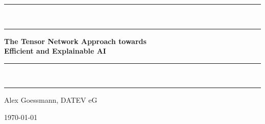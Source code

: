 
\newcommand{\vsp}[1]{\vspace{#1\baselineskip}}
\newcommand{\hsp}[1]{\hspace{#1em}}


{\hfuzz=12pt
\begin{fullsizetitle}
\centering

	\vsp{10}
	
	\vsp{3}
	
	\rule{0.7\textwidth}{.4pt}\\[\dimexpr-\baselineskip+1mm+2pt]
	\rule{0.7\textwidth}{2pt}
	
	\vsp{1}
	\begin{minipage}{.7\textwidth}
		\centering\Large
		\textbf{The Tensor Network Approach towards \\
		Efficient and Explainable AI}
	\end{minipage}
	\vsp{1}
	
	\rule{0.7\textwidth}{2pt}\\[\dimexpr-\baselineskip+1mm+1pt]
	\rule{0.7\textwidth}{.4pt}
	
	\vsp{1}
	
	\large

	\vsp{1} { {Alex Goessmann, DATEV eG}}

	\vsp{2}

	\vsp{2}
	
	\centering
	\today

\end{fullsizetitle}
}


